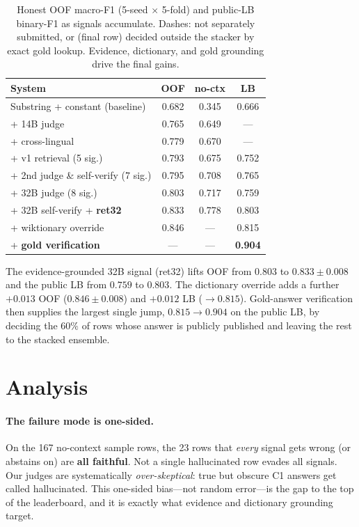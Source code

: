 \documentclass[11pt]{article}
\begin{document}
\begin{table}[t]
\centering\small
\setlength{\tabcolsep}{4pt}
\begin{tabular}{lccc}
\toprule
System & OOF & no-ctx & LB \\
\midrule
Substring + constant (baseline)      & 0.682 & 0.345 & 0.666 \\
\;+ 14B judge                        & 0.765 & 0.649 & --- \\
\;+ cross-lingual                    & 0.779 & 0.670 & --- \\
\;+ v1 retrieval (5 sig.)            & 0.793 & 0.675 & 0.752 \\
\;+ 2nd judge \& self-verify (7 sig.)& 0.795 & 0.708 & 0.765 \\
\;+ 32B judge (8 sig.)               & 0.803 & 0.717 & 0.759 \\
\;+ 32B self-verify + \textbf{ret32} & 0.833 & 0.778 & 0.803 \\
\;+ wiktionary override               & 0.846 & --- & 0.815 \\
\;+ \textbf{gold verification}        & --- & --- & \textbf{0.904} \\
\bottomrule
\end{tabular}
\caption{Honest OOF macro-F1 (5-seed $\times$ 5-fold) and public-LB binary-F1
as signals accumulate. Dashes: not separately submitted, or (final row) decided
outside the stacker by exact gold lookup. Evidence, dictionary, and gold
grounding drive the final gains.}
\label{tab:prog}
\end{table}

The evidence-grounded 32B signal (ret32) lifts OOF from $0.803$ to
$0.833\pm0.008$ and the public LB from $0.759$ to $0.803$. The dictionary
override adds a further $+0.013$ OOF ($0.846\pm0.008$) and $+0.012$ LB
($\rightarrow0.815$). Gold-answer verification then supplies the largest single
jump, $0.815\rightarrow0.904$ on the public LB, by deciding the $60\%$ of rows
whose answer is publicly published and leaving the rest to the stacked ensemble.

\section{Analysis}
\label{sec:analysis}
\paragraph{The failure mode is one-sided.} On the 167 no-context sample rows,
the 23 rows that \emph{every} signal gets wrong (or abstains on) are
\textbf{all faithful}. Not a single hallucinated row evades all signals. Our
judges are systematically \emph{over-skeptical}: true but obscure C1 answers get
called hallucinated. This one-sided bias---not random error---is the gap to the
top of the leaderboard, and it is exactly what evidence and dictionary
grounding target.
\end{document}
